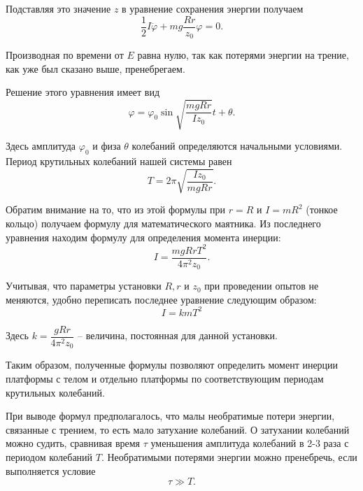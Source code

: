 \documentclass[a4paper,12pt]{article}
\begin{document}
Подставляя это значение $z$ в уравнение сохранения энергии получаем 
\[ \frac{1}{2}I \ddot{\varphi} + mg\frac{Rr}{z_0}\varphi = 0.\] 

Производная по времени от $E$ равна нулю, так как потерями энергии на трение, как уже был сказано выше, пренебрегаем.

Решение этого уравнения имеет вид 
\[ \varphi = \varphi_0\sin{\sqrt{\frac{mgRr}{Iz_0}}t + \theta} .\]

Здесь амплитуда $\varphi_0$ и физа $\theta$ колебаний определяются начальными условиями. Период крутильных колебаний нашей системы равен 
\[ T = 2\pi \sqrt{\frac{Iz_0}{mgRr}}.\]

Обратим внимание на то, что из этой формулы при $r = R$ и $I = mR^2$ (тонкое кольцо) получаем формулу для математического маятника. Из последнего уравнения находим формулу для определения момента инерции:
\[ I = \frac{mgRrT^2}{4\pi^2 z_0}.\]

Учитывая, что параметры установки $R,r$ и $z_0$ при проведении опытов не меняются, удобно переписать последнее уравнение следующим образом: 
$$\label{eq1}
I = kmT^2
$$

Здесь $k = \dfrac{gRr}{4\pi^2 z_0}$ -- величина, постоянная для данной установки.

Таким образом, полученные формулы позволяют определить момент инерции платформы с телом и отдельно платформы по соответствующим периодам крутильных колебаний.

При выводе формул предполагалось, что малы необратимые потери энергии, связанные с трением, то есть мало затухание колебаний. О затухании колебаний можно судить, сравнивая время $\tau$ уменьшения амплитуда колебаний в 2-3 раза с периодом колебаний $T$. Необратимыми потерями энергии можно пренебречь, если выполняется условие 
\[ \tau \gg T .\]
\end{document}
